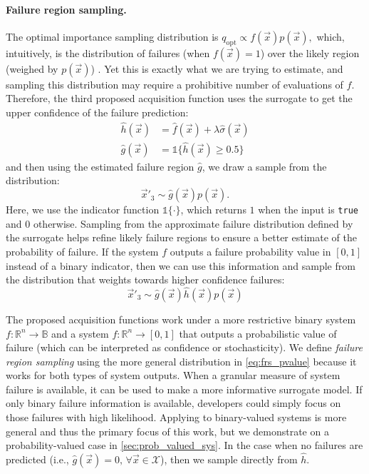 \paragraph{Failure region sampling.} The optimal importance sampling distribution is
\(
q_\text{opt} \propto f(\vec{x})p(\vec{x}),
\)
which, intuitively, is the distribution of failures (when $f(\vec{x}) = 1$) over the likely region (weighed by $p(\vec{x})$) \cite{kahn1953methods,murphy2012machine,owen2013monte}.
Yet this is exactly what we are trying to estimate, and sampling this distribution may require a prohibitive number of evaluations of $f$.
Therefore, the third proposed acquisition function uses the surrogate to get the upper confidence of the failure prediction:
\begin{align}
    \hat{h}(\vec{x}) &= \hat{f}(\vec{x}) + \lambda\hat{\sigma}(\vec{x})\\
    \hat{g}(\vec{x}) &= \mathds{1}\bigl\{\hat{h}(\vec{x}) \ge 0.5\bigr\}
\end{align}
and then using the estimated failure region $\hat{g}$, we draw a sample from the distribution:
\begin{equation}
    \vec{x}'_3 \sim \hat{g}(\vec{x})p(\vec{x}).
\end{equation}
Here, we use the indicator function $\mathds{1}\{ \cdot \}$, which returns $1$ when the input is \texttt{true} and $0$ otherwise.
Sampling from the approximate failure distribution defined by the surrogate helps refine likely failure regions to ensure a better estimate of the probability of failure.
If the system $f$ outputs a failure probability value in $[0,1]$ instead of a binary indicator, then we can use this information and sample from the distribution that weights towards higher confidence failures:
\begin{equation}
    \vec{x}'_3 \sim \hat{g}(\vec{x})\hat{h}(\vec{x})p(\vec{x}) \label{eq:frs_pvalue}
\end{equation}

The proposed acquisition functions work under a more restrictive binary system $f: \mathbb{R}^n \to \mathbb{B}$ and a system $f: \mathbb{R}^n \to [0,1]$ that outputs a probabilistic value of failure (which can be interpreted as confidence or stochasticity).
We define \textit{failure region sampling} using the more general distribution in \cref{eq:frs_pvalue} because it works for both types of system outputs.
When a granular measure of system failure is available, it can be used to make a more informative surrogate model.
If only binary failure information is available, developers could simply focus on those failures with high likelihood.
Applying to binary-valued systems is more general and thus the primary focus of this work, but we demonstrate on a probability-valued case in \cref{sec:prob_valued_sys}.
In the case when no failures are predicted (i.e., $\hat{g}(\vec{x}) = 0,\, \forall \vec{x} \in \mathcal{X}$), then we sample directly from $\hat{h}$.

